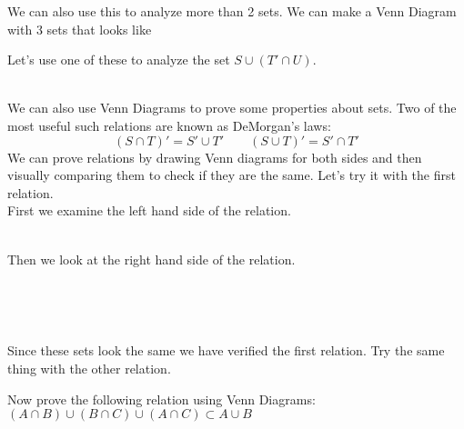 \documentclass[14,fleqn]{article}
\begin{document}
We can also use this to analyze more than 2 sets. We can make a Venn Diagram with 3 sets that looks like\\
\begin{center}
\end{center}

Let's use one of these to analyze the set $S\cup (T'\cap U).$\\
\begin{venndiagram3sets}[labelA=$S$,labelB=$T$,labelC=$U$]
	\fillA
	\fillOnlyC
\end{venndiagram3sets}\\
We can also use Venn Diagrams to prove some properties about sets. Two of the most useful such relations are known as DeMorgan's laws:
\[
	(S\cap T)'=S'\cup T' \qquad (S\cup T)'=S'\cap T'
\]
We can prove relations by drawing Venn diagrams for both sides and then visually comparing them to check if they are the same. Let's try it with the first relation.\\
First we examine the left hand side of the relation.
\begin{center}
\begin{venndiagram2sets}[labelA=$S$,labelB=$T$]
	\fillACapB
\end{venndiagram2sets}
\hspace{1 in}
\begin{venndiagram2sets}[labelA=$S$,labelB=$T$]
	\fillNotA
	\fillNotB
\end{venndiagram2sets}\\
Then we look at the right hand side of the relation.\\
\begin{venndiagram2sets}[labelA=$S$,labelB=$T$]
	\fillNotA
\end{venndiagram2sets}
\hspace{1 in}
\begin{venndiagram2sets}[labelA=$S$,labelB=$T$]
	\fillNotB
\end{venndiagram2sets}\\
\begin{venndiagram2sets}[labelA=$S$,labelB=$T$]
	\fillNotAorNotB
\end{venndiagram2sets}\\
\end{center}
Since these sets look the same we have verified the first relation. Try the same thing with the other relation.

Now prove the following relation using Venn Diagrams: $(A\cap B)\cup (B\cap C) \cup (A\cap C)\subset A\cup B$
\end{document}
